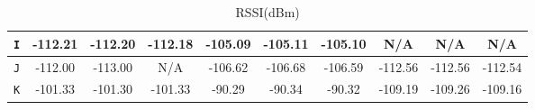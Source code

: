 \begin{table}[H]
\begin{subtable}{\textwidth}
\begin{center}
\begin{tabular}{|c|c|c|c|c|c|c|c|c|c|}
                        \texttt{I} & -112.21                               & -112.20                                 & -112.18                                & -105.09        & -105.11        & -105.10        & N/A            & N/A            & N/A            \\ \hline
                        \texttt{J} & -112.00                               & -113.00                                 & N/A                                    & -106.62        & -106.68        & -106.59        & -112.56        & -112.56        & -112.54        \\ \hline
                        \texttt{K} & -101.33                               & -101.30                                 & -101.33                                & -90.29         & -90.34         & -90.32         & -109.19        & -109.26        & -109.16        \\ \hline
                  \end{tabular}
                  \caption{RSSI(dBm)}
                  \label{table:rssi4}
            \end{center}
      \end{subtable}%
      \label{tab:table1}
\end{table}



